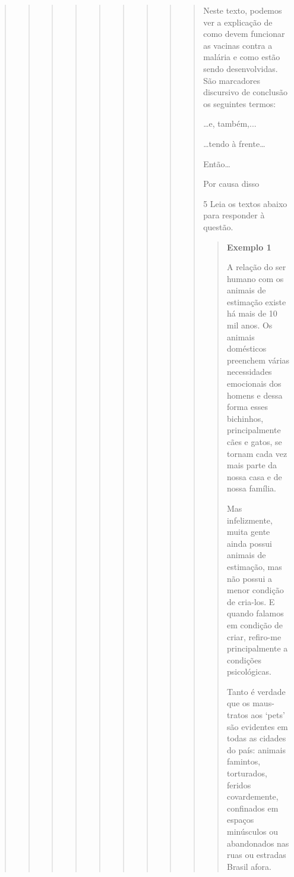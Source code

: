 \begin{quote}
\begin{quote}
\begin{quote}
\begin{quote}
\begin{quote}
\begin{quote}
{\begin{quote}
\begin{quote}
{\begin{quote}

Neste texto, podemos ver a explicação de como devem funcionar as vacinas
contra a malária e como estão sendo desenvolvidas. São marcadores
discursivo de conclusão os seguintes termos:

\begin{escolha}

\item
  \ldots e, também,...
\item
  \ldots tendo à frente\ldots{}
\item
  Então\ldots{}
\item
  Por causa disso
\end{escolha}


\num{5} Leia os textos abaixo para responder à questão. 

\begin{quote}

\textbf{Exemplo 1}

A relação do ser humano com os animais de estimação existe há mais de 10
mil anos. Os animais domésticos preenchem várias necessidades emocionais
dos homens e dessa forma esses bichinhos, principalmente cães e gatos,
se tornam cada vez mais parte da nossa casa e de nossa família.

Mas infelizmente, muita gente ainda possui animais de estimação, mas não
possui a menor condição de cria-los. E quando falamos em condição de
criar, refiro-me principalmente a condições psicológicas.

Tanto é verdade que os maus-tratos aos `pets' são evidentes em todas as
cidades do país: animais famintos, torturados, feridos covardemente,
confinados em espaços minúsculos ou abandonados nas ruas ou estradas
Brasil afora.


\end{quote}
\end{quote}}
\end{quote}
\end{quote}}
\end{quote}
\end{quote}
\end{quote}
\end{quote}
\end{quote}
\end{quote}
